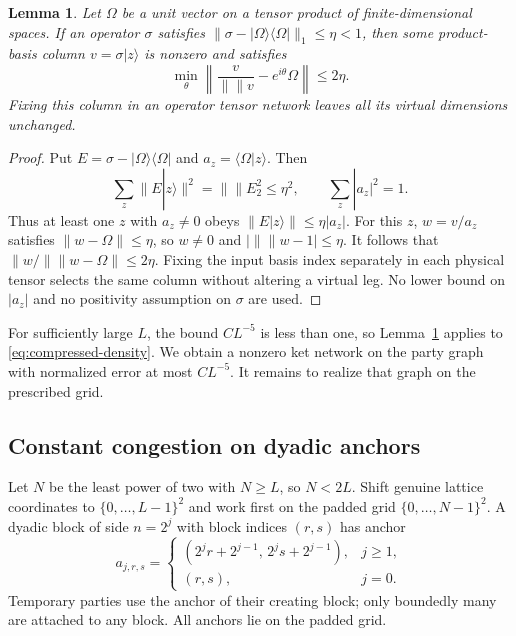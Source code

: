 \documentclass[11pt]{article}
\numberwithin{equation}{section}
\newtheorem{lemma}[theorem]{Lemma}
\theoremstyle{definition}
\theoremstyle{remark}
\begin{document}
\begin{lemma}\label{lem:columns}
Let $\Omega$ be a unit vector on a tensor product of finite-dimensional
spaces. If an operator $\sigma$ satisfies
$\lVert \sigma-|\Omega\rangle\langle\Omega|\rVert_1\le\eta<1$, then some
product-basis column $v=\sigma|z\rangle$ is nonzero and satisfies
\[
 \min_\theta\left\|\frac{v}{\lVert \rVert v}-e^{i\theta}\Omega\right\|
 \le2\eta.
\]
Fixing this column in an operator tensor network leaves all its virtual
dimensions unchanged.
\end{lemma}
\begin{proof}
Put $E=\sigma-|\Omega\rangle\langle\Omega|$ and
$a_z=\langle\Omega|z\rangle$. Then
\[
 \sum_z\lVert E|z\rangle\rVert^2=\lVert \rVert E_2^2\le\eta^2,
 \qquad \sum_z|a_z|^2=1.
\]
Thus at least one $z$ with $a_z\ne0$ obeys
$\lVert E|z\rangle\rVert\le\eta|a_z|$. For this $z$,
$w=v/a_z$ satisfies $\lVert w-\Omega\rVert\le\eta$, so $w\ne0$ and
$|\lVert \rVert w-1|\le\eta$. It follows that
$\lVert w/\lVert \rVert w-\Omega\rVert\le2\eta$.
Fixing the input basis index separately in each physical tensor selects
the same column without altering a virtual leg. No lower bound on
$|a_z|$ and no positivity assumption on $\sigma$ are used.
\end{proof}

For sufficiently large $L$, the bound $CL^{-5}$ is less than one, so
Lemma~\ref{lem:columns} applies to \eqref{eq:compressed-density}. We obtain a
nonzero ket network on the party graph with normalized error at most
$CL^{-5}$. It remains to realize that graph on the prescribed grid.

\subsection{Constant congestion on dyadic anchors}

Let $N$ be the least power of two with $N\ge L$, so $N<2L$.
Shift genuine lattice coordinates to $\{0,\ldots,L-1\}^2$ and work first
on the padded grid $\{0,\ldots,N-1\}^2$. A dyadic block of side $n=2^j$
with block indices $(r,s)$ has anchor
\begin{equation}\label{eq:anchors}
 a_{j,r,s}=\begin{cases}
 (2^jr+2^{j-1},\,2^js+2^{j-1}),&j\ge1,\\
 (r,s),&j=0.
 \end{cases}
\end{equation}
Temporary parties use the anchor of their creating block; only boundedly
many are attached to any block. All anchors lie on the padded grid.
\end{document}
